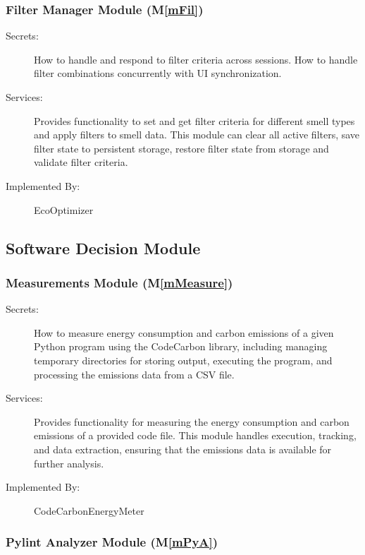 \documentclass[12pt, titlepage]{article}
\newcommand{\mref}[1]{M\ref{#1}}
\begin{document}
\subsubsection{Filter Manager Module (\mref{mFil})}

\begin{description}
    \item[Secrets:] How to handle and respond to filter criteria across sessions. How to handle filter combinations concurrently with UI synchronization.
    \item[Services:] Provides functionality to set and get filter criteria for different smell types and apply filters to smell data. This module can clear all active filters, save filter state to persistent storage, restore filter state from storage and validate filter criteria.
    \item[Implemented By:] EcoOptimizer
\end{description}

\subsection{Software Decision Module}

\subsubsection{Measurements Module (\mref{mMeasure})}

\begin{description}
\item[Secrets:] How to measure energy consumption and carbon emissions of a given Python program using the CodeCarbon library, including managing temporary directories for storing output, executing the program, and processing the emissions data from a CSV file.
\item[Services:] Provides functionality for measuring the energy consumption and carbon emissions of a provided code file. This module handles execution, tracking, and data extraction, ensuring that the emissions data is available for further analysis.
\item[Implemented By:] CodeCarbonEnergyMeter
\end{description}

\subsubsection{Pylint Analyzer Module (\mref{mPyA})}
\end{document}

